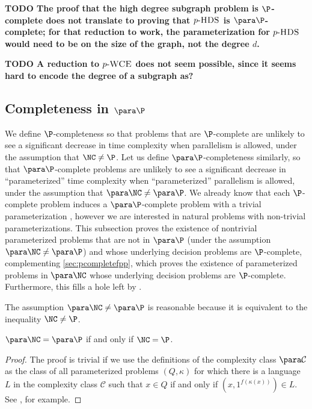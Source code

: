 \documentclass{article}
\newcommand{\todo}[1]{\textbf{TODO #1}}
\newcommand{\dash}{\textnormal{-}}
\newcommand{\pHDS}{p \dash \textsc{HDS}}
\newcommand{\pWCE}{p \dash \textsc{WCE}}
\begin{document}

\todo{The proof that the high degree subgraph problem is $\P$-complete does not translate to proving that $\pHDS$ is $\para \P$-complete; for that reduction to work, the parameterization for $\pHDS$ would need to be on the size of the graph, not the degree $d$.}

\todo{A reduction to $\pWCE$ does not seem possible, since it seems hard to encode the degree of a subgraph as?}

\subsection{Completeness in \texorpdfstring{$\para \P$}{paraP}}

We define $\P$-completeness so that problems that are $\P$-complete are unlikely to see a significant decrease in time complexity when parallelism is allowed, under the assumption that $\NC \neq \P$.
Let us define $\para \P$-completeness similarly, so that $\para \P$-complete problems are unlikely to see a significant decrease in ``parameterized'' time complexity when ``parameterized'' parallelism is allowed, under the assumption that $\para \NC \neq \para \P$.
We already know that each $\P$-complete problem induces a $\para \P$-complete problem with a trivial parameterization \autocite[Proposition~14]{fg03}, however we are interested in natural problems with non-trivial parameterizations.
This subsection proves the existence of nontrivial parameterized problems that are not in $\para \P$ (under the assumption $\para \NC \neq \para \P$) and whose underlying decision problems are $\P$-complete, complementing \autoref{sec:pcompletefpp}, which proves the existence of parameterized problems in $\para \NC$ whose underlying decision problems are $\P$-complete.
Furthermore, this fills a hole left by \autocite{est15}.

The assumption $\para \NC \neq \para \P$ is reasonable because it is equivalent to the inequality $\NC \neq \P$.

\begin{proposition}
  $\para \NC = \para \P$ if and only if $\NC = \P$.
\end{proposition}
\begin{proof}
  The proof is trivial if we use the definitions of the complexity class $\para \mathcal{C}$ as the class of all parameterized problems $(Q, \kappa)$ for which there is a language $L$ in the complexity class $\mathcal{C}$ such that $x \in Q$ if and only if $(x, 1^{f(\kappa(x))}) \in L$.
  See \autocite[Proposition~8]{fg03}, for example.
\end{proof}
\end{document}
